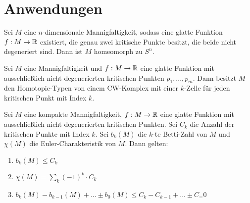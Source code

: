 \section{Anwendungen}

\begin{theorem}
    Sei $M$ eine $n$-dimensionale Mannigfaltigkeit, sodass eine glatte Funktion
    $f: M \to { \mathbb R }$ existiert, die genau zwei kritische Punkte besitzt, die beide
    nicht degeneriert sind. Dann ist $M$ homeomorph zu $S^n$.
\end{theorem}

\begin{theorem}
    Sei $M$ eine Mannigfaltigkeit und $f: M \to { \mathbb R }$ eine glatte Funktion mit 
    ausschließlich nicht degenerierten kritischen Punkten $p_1, ..., p_m$. 
    Dann besitzt $M$ den Homotopie-Typen von einem CW-Komplex mit einer $k$-Zelle 
    für jeden kritischen Punkt mit Index $k$.
\end{theorem}

\begin{theorem}
    Sei $M$ eine kompakte Mannigfaltigkeit, $f: M \to { \mathbb R }$ eine glatte Funktion
    mit ausschließlich nicht degenerierten kritischen Punkten. Sei $C_k$ die
    Anzahl der kritischen Punkte mit Index $k$. Sei $b_k(M)$ die $k$-te 
    Betti-Zahl von $M$ und $\chi(M)$ die Euler-Charakteristik von $M$. 
    Dann gelten:
    \begin{enumerate}
        \item $ b_k(M) \leq C_k $ 
        \item $ \chi(M) = \sum_k (-1)^k \cdot C_k $
        \item $ b_k(M) - b_{k - 1}(M) + ... \pm b_0(M) \leq C_k - C_{k-1} + ... \pm C_=0 $
    \end{enumerate}
\end{theorem}